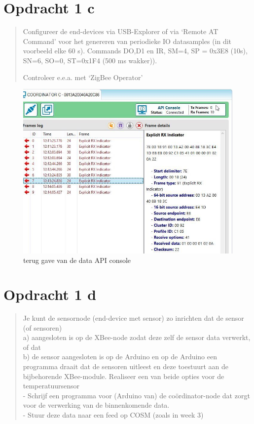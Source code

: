\documentclass[12pt]{article}
\begin{document}
\section*{Opdracht 1 c}
\begin{quote}
Configureer de end-devices via USB-Explorer of via ‘Remote AT Command’ voor het genereren van periodieke IO datasamples (in dit voorbeeld elke 60 s). Commands DO,D1 en IR, SM=4, SP = 0x3E8 (10s), SN=6, SO=0, ST=0x1F4 (500 ms wakker)).

	Controleer e.e.a. met ‘ZigBee Operator’
\end{quote}
\begin{figure}[H]
\captionsetup{justification=raggedright,
singlelinecheck=false
}
\includegraphics[scale=0.7] {1c-een}
\caption{terug gave van de data API console}
\end{figure}
\newpage
\section*{Opdracht 1 d}
\begin{quote}
	Je kunt de sensornode (end-device met sensor) zo inrichten dat de sensor (of sensoren)\\ a) aangesloten is op de XBee-node zodat deze zelf de sensor data verwerkt, of dat \\ b) de sensor aangesloten is op de Arduino en op de Arduino een programma draait dat de 	sensoren uitleest en deze toestuurt aan de bijbehorende XBee-module. Realiseer een van beide opties voor de temperatuursensor  \\
- Schrijf een programma voor (Arduino van) de coördinator-node dat zorgt voor de verwerking van de binnenkomende data. \\
- Stuur deze data naar een feed op COSM (zoals in week 3)
\end{quote}
\end{document}
